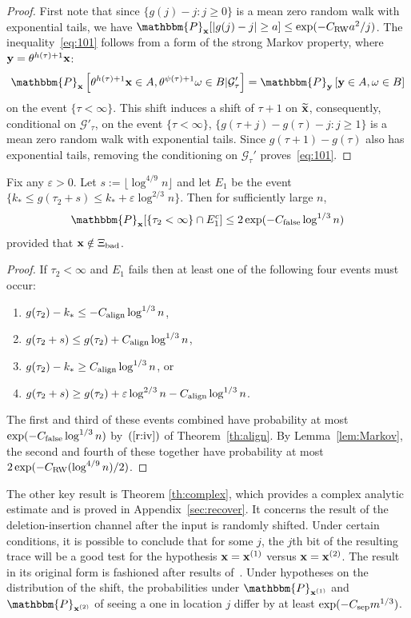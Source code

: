 \documentclass[final,12pt]{colt2018} %
\renewcommand{\P}{\mathbbm{P}}
\newcommand{\1}{\mathbf{1}}
\def\cG{\mathcal{G}}
\newcommand{\wt}{\widetilde}
\def\xt{{\wt {\bf x}}}
\def\x{{\bf x}}
\def\y{{\bf y}}
\def\ee{\varepsilon}
\def\csep{C_{\rm sep}} %
\def\calign{C_{\rm align}}
\def\cfalse{C_{\rm false}}
\def\crw{C_{\rm RW}}
\def\bad{{\Xi_{\rm bad}}}
\begin{document}
\begin{proof}
	First note that since $\{ g(j) - j  :
	j \geq 0\}$ is a mean zero random walk with exponential tails, we have $\P_\x [|g(j) - j| \geq a] \leq \exp (- \crw a^2 / j)$.
	The inequality~\eqref{eq:101} follows from a form of the strong Markov
	property, where $\y=\theta^{h(\tau)+1} \x$:
	$$\P_{\x}  \left [
	\theta^{h(\tau) + 1} \x \in A , \theta^{\psi(\tau)+1} \omega \in B |
	\cG_{\tau}' \right ]
	= \P_{\y} \left [ \y \in A , \omega \in B \right ] $$
	on the event $\{ \tau < \infty \}$.
	This shift induces a shift of $\tau+1$ on $\xt$,
	consequently, conditional on $\cG'_\tau$, on the event $\{ \tau < \infty \}$,
	$\{ g(\tau + j) - g(\tau) - j : j \geq 1 \}$ is a mean zero random walk
	with exponential tails. Since $g(\tau+1)-g(\tau)$ also has exponential tails, removing the conditioning
	on $\cG_\tau'$ proves~\eqref{eq:101}.
\end{proof}


\begin{corollary} \label{cor:within}
	Fix any $\ee > 0$.
	Let $s := \lfloor \log^{4/9} n \rfloor$ and let $E_1$ be the event
	$\{ k_* \leq g(\tau_2 + s) \leq k_* + \ee \log^{2/3} n \}$.  Then
	for sufficiently large $n$,
	$$\P_\x [\{ \tau_2 < \infty \} \cap E_1^c] \leq
	2 \exp (-\cfalse \log^{1/3} n)$$
	provided that $\x \notin \bad$.
\end{corollary}

\begin{proof}
	If $\tau_2 < \infty$ and $E_1$ fails then at least one of the
	following four events must occur:
	\begin{enumerate}[$(i)$]
		\item $g(\tau_2) - k_* \leq - \calign \log^{1/3} n$,
		\item $g(\tau_2 + s) \leq g(\tau_2) + \calign \log^{1/3} n$,
		\item $g(\tau_2) - k_* \geq \calign \log^{1/3} n$, or
		\item $g(\tau_2 + s ) \geq g(\tau_2) + \ee \log^{2/3} n - \calign \log^{1/3} n$.
	\end{enumerate}
	The first and third of these events combined have probability at
	most $\exp (- \cfalse \log^{1/3} n)$ by~$(\ref{r:iv})$ of
	Theorem~\ref{th:align}.  By Lemma~\ref{lem:Markov}, the second
	and fourth of these together have probability at most
	$2 \exp (-\crw (\log^{4/9} n)/2 )$.
\end{proof}

The other key result is Theorem \ref{th:complex}, which provides a complex analytic estimate and is proved in Appendix~\ref{sec:recover}. It concerns the result of the
deletion-insertion channel after the input is randomly shifted.
Under certain conditions, it is possible to conclude that for some $j$,
the $j$th bit of the resulting trace will be a good test for the
hypothesis $\x = \x^{(1)}$ versus $\x = \x^{(2)}$.  The result
in its original form is fashioned after results of~\citet*{DOS16,NP16,PZ17}.
Under hypotheses on the distribution of the shift, the probabilities
under $\P_{\x^{(1)}}$ and $\P_{\x^{(2)}}$ of seeing a one in location $j$
differ by at least $\exp ( - \csep m^{1/3} )$.
\end{document}
